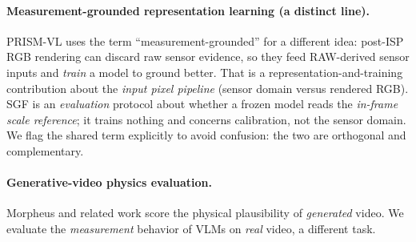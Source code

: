 \documentclass[11pt]{article}
\begin{document}
\paragraph{Measurement-grounded representation learning (a distinct line).}
PRISM-VL \citep{prismvl2026} uses the term ``measurement-grounded'' for a
different idea: post-ISP RGB rendering can discard raw sensor evidence, so they
feed RAW-derived sensor inputs and \emph{train} a model to ground better. That is
a representation-and-training contribution about the \emph{input pixel pipeline}
(sensor domain versus rendered RGB). SGF is an \emph{evaluation} protocol about
whether a frozen model reads the \emph{in-frame scale reference}; it trains
nothing and concerns calibration, not the sensor domain. We flag the shared term
explicitly to avoid confusion: the two are orthogonal and complementary.

\paragraph{Generative-video physics evaluation.}
Morpheus \citep{morpheus2025} and related work score the physical plausibility of
\emph{generated} video. We evaluate the \emph{measurement} behavior of VLMs on
\emph{real} video, a different task.
\end{document}
